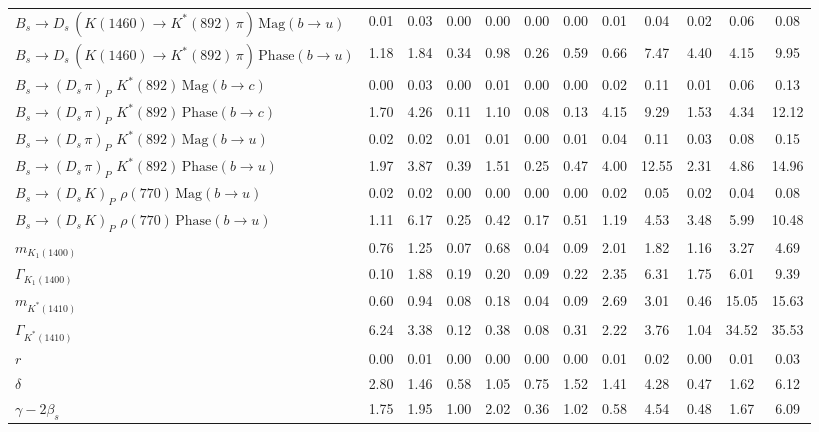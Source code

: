 \begin{tabular}{l  c  c  c  c  c  c  c  c  c  c  | c }
$B_s \to D_s \, ( K(1460) \to K^{*}(892) \, \pi ) \, \text{Mag} (b \to u)$ & 0.01 & 0.03 & 0.00 & 0.00 & 0.00 & 0.00 & 0.01 & 0.04 & 0.02 & 0.06 & 0.08 \\ 
$B_s \to D_s \, ( K(1460) \to K^{*}(892) \, \pi ) \, \text{Phase} (b \to u)$ & 1.18 & 1.84 & 0.34 & 0.98 & 0.26 & 0.59 & 0.66 & 7.47 & 4.40 & 4.15 & 9.95 \\ 
$B_s \to ( D_s \, \pi)_{P} \, \, K^{*}(892) \, \text{Mag} (b \to c)$ & 0.00 & 0.03 & 0.00 & 0.01 & 0.00 & 0.00 & 0.02 & 0.11 & 0.01 & 0.06 & 0.13 \\ 
$B_s \to ( D_s \, \pi)_{P} \, \, K^{*}(892) \, \text{Phase} (b \to c)$ & 1.70 & 4.26 & 0.11 & 1.10 & 0.08 & 0.13 & 4.15 & 9.29 & 1.53 & 4.34 & 12.12 \\ 
$B_s \to ( D_s \, \pi)_{P} \, \, K^{*}(892) \, \text{Mag} (b \to u)$ & 0.02 & 0.02 & 0.01 & 0.01 & 0.00 & 0.01 & 0.04 & 0.11 & 0.03 & 0.08 & 0.15 \\ 
$B_s \to ( D_s \, \pi)_{P} \, \, K^{*}(892) \, \text{Phase} (b \to u)$ & 1.97 & 3.87 & 0.39 & 1.51 & 0.25 & 0.47 & 4.00 & 12.55 & 2.31 & 4.86 & 14.96 \\ 
$B_s \to ( D_s \, K)_{P} \, \, \rho(770) \, \text{Mag} (b \to u)$ & 0.02 & 0.02 & 0.00 & 0.00 & 0.00 & 0.00 & 0.02 & 0.05 & 0.02 & 0.04 & 0.08 \\ 
$B_s \to ( D_s \, K)_{P} \, \, \rho(770) \, \text{Phase} (b \to u)$ & 1.11 & 6.17 & 0.25 & 0.42 & 0.17 & 0.51 & 1.19 & 4.53 & 3.48 & 5.99 & 10.48 \\ 
$m_{K_1(1400)} $ & 0.76 & 1.25 & 0.07 & 0.68 & 0.04 & 0.09 & 2.01 & 1.82 & 1.16 & 3.27 & 4.69 \\ 
$\Gamma_{K_1(1400)}$ & 0.10 & 1.88 & 0.19 & 0.20 & 0.09 & 0.22 & 2.35 & 6.31 & 1.75 & 6.01 & 9.39 \\ 
$m_{K^{*}(1410)}$ & 0.60 & 0.94 & 0.08 & 0.18 & 0.04 & 0.09 & 2.69 & 3.01 & 0.46 & 15.05 & 15.63 \\ 
$\Gamma_{K^{*}(1410)}$ & 6.24 & 3.38 & 0.12 & 0.38 & 0.08 & 0.31 & 2.22 & 3.76 & 1.04 & 34.52 & 35.53 \\ 
$r$ & 0.00 & 0.01 & 0.00 & 0.00 & 0.00 & 0.00 & 0.01 & 0.02 & 0.00 & 0.01 & 0.03 \\ 
$\delta$ & 2.80 & 1.46 & 0.58 & 1.05 & 0.75 & 1.52 & 1.41 & 4.28 & 0.47 & 1.62 & 6.12 \\ 
$\gamma - 2 \beta_{s}$ & 1.75 & 1.95 & 1.00 & 2.02 & 0.36 & 1.02 & 0.58 & 4.54 & 0.48 & 1.67 & 6.09 \\ 
\hline
\hline
\end{tabular}
